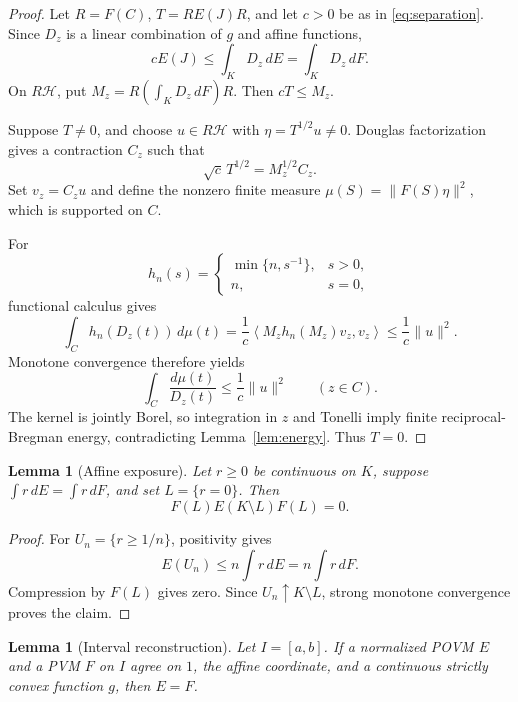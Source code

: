 \documentclass[11pt,a4paper]{amsart}
\newtheorem{lemma}[theorem]{Lemma}
\theoremstyle{remark}
\newcommand{\calH}{\mathcal H}
\newcommand{\inner}[2]{\left\langle #1,#2\right\rangle}
\begin{document}
\begin{proof}
Let \(R=F(C)\), \(T=RE(J)R\), and let \(c>0\) be as in
\eqref{eq:separation}.  Since \(D_z\) is a linear combination of \(g\) and
affine functions,
\[
 cE(J)\leq\int_KD_z\,dE=\int_KD_z\,dF.
\]
On \(R\calH\), put \(M_z=R(\int_KD_z\,dF)R\).  Then \(cT\leq M_z\).

Suppose \(T\neq0\), and choose \(u\in R\calH\) with
\(\eta=T^{1/2}u\neq0\).  Douglas factorization gives a contraction \(C_z\)
such that
\[
 \sqrt c\,T^{1/2}=M_z^{1/2}C_z.
\]
Set \(v_z=C_zu\) and define the nonzero finite measure
\(\mu(S)=\|F(S)\eta\|^2\), which is supported on \(C\).

For
\[
 h_n(s)=
 \begin{cases}
 \min\{n,s^{-1}\},&s>0,\\
 n,&s=0,
 \end{cases}
\]
functional calculus gives
\[
 \int_C h_n(D_z(t))\,d\mu(t)
 =\frac1c\inner{M_zh_n(M_z)v_z}{v_z}
 \leq\frac1c\|u\|^2.
\]
Monotone convergence therefore yields
\[
 \int_C\frac{d\mu(t)}{D_z(t)}\leq\frac1c\|u\|^2
 \qquad(z\in C).
\]
The kernel is jointly Borel, so integration in \(z\) and Tonelli imply
finite reciprocal-Bregman energy, contradicting
Lemma~\ref{lem:energy}.  Thus \(T=0\).
\end{proof}

\begin{lemma}[Affine exposure]\label{lem:exposure}
Let \(r\geq0\) be continuous on \(K\), suppose
\(\int r\,dE=\int r\,dF\), and set \(L=\{r=0\}\).  Then
\[
 F(L)E(K\setminus L)F(L)=0.
\]
\end{lemma}

\begin{proof}
For \(U_n=\{r\geq1/n\}\), positivity gives
\[
 E(U_n)\leq n\int r\,dE=n\int r\,dF.
\]
Compression by \(F(L)\) gives zero.  Since \(U_n\uparrow K\setminus L\),
strong monotone convergence proves the claim.
\end{proof}

\begin{lemma}[Interval reconstruction]\label{lem:interval}
Let \(I=[a,b]\).  If a normalized POVM \(E\) and a PVM \(F\) on \(I\) agree
on \(1\), the affine coordinate, and a continuous strictly convex function
\(g\), then \(E=F\).
\end{lemma}
\end{document}
